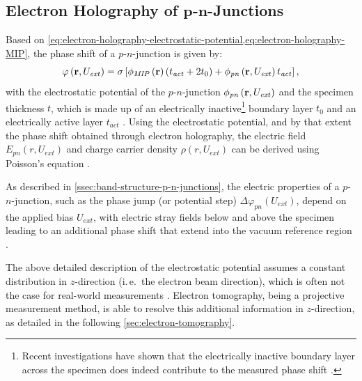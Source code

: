 \subsection[Electron Holography of \texorpdfstring{$p$-$n$}{\textit{p}-\textit{n}}-Junctions]{Electron Holography of $\boldsymbol{p}$-$\boldsymbol{n}$-Junctions} \label{ssec:electron-holography-pn-junctions}
Based on \cref{eq:electron-holography-electrostatic-potential,eq:electron-holography-MIP}, the phase shift of a $p$-$n$-junction is given by:
\begin{equation}
  \label{eq:EH-phase-shift-specimen}
  \varphi\left(\vb{r}, U_{\mathit{ext}}\right) = \sigma \left[\phi_{\mathit{MIP}}\left(\vb{r}\right)\left(t_{\mathit{act}} + 2t_0\right) + \phi_{\mathit{pn}}\left(\vb{r}, U_{\mathit{ext}}\right)t_{\mathit{act}}\right],
\end{equation}
with the electrostatic potential of the $p$-$n$-junction $\phi_{\mathit{pn}}\left(\vb{r}, U_{\mathit{ext}}\right)$ and the specimen thickness $t$, which is made up of an electrically inactive\footnote{Recent investigations have shown that the electrically inactive boundary layer across the specimen does indeed contribute to the measured phase shift \cite{Wagner2022}.} boundary layer $t_0$ and an electrically active layer $t_{\mathit{act}}$ \cite{Frabboni1987,Twitchett2002,Cooper2006,Cooper2007,Cooper2009,He2013,Yazdi2015}. Using the electrostatic potential, and by that extent the phase shift obtained through electron holography, the electric field $E_{\mathit{pn}}\left(r, U_{\mathit{ext}}\right)$ and charge carrier density $\rho\left(r, U_{\mathit{ext}}\right)$ can be derived using Poisson's equation \cite{Frabboni1987,Twitchett2002,Yazdi2015}.

As described in \cref{ssec:band-structure-p-n-junctions}, the electric properties of a $p$-$n$-junction, such as the phase jump (or potential step) $\Delta \varphi_{\mathit{pn}}\left(U_{\mathit{ext}}\right)$, depend on the applied bias $U_{\mathit{ext}}$, with electric stray fields below and above the specimen leading to an additional phase shift that extend into the vacuum reference region \cite{Frabboni1987,Twitchett2002,Yazdi2015}.

The above detailed description of the electrostatic potential assumes a constant distribution in $z$-direction (i.\,e.\ the electron beam direction), which is often not the case for real-world measurements \cite{Twitchett-Harrison2007,Wagner2019}. Electron tomography, being a projective measurement method, is able to resolve this additional information in $z$-direction, as detailed in the following \cref{sec:electron-tomography}.

